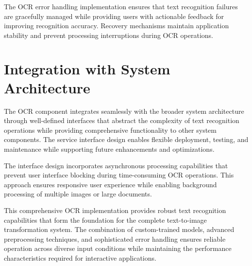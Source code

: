 The OCR error handling implementation ensures that text recognition failures are gracefully managed while providing users with actionable feedback for improving recognition accuracy. Recovery mechanisms maintain application stability and prevent processing interruptions during OCR operations.

\section{Integration with System Architecture}

The OCR component integrates seamlessly with the broader system architecture through well-defined interfaces that abstract the complexity of text recognition operations while providing comprehensive functionality to other system components. The service interface design enables flexible deployment, testing, and maintenance while supporting future enhancements and optimizations.

The interface design incorporates asynchronous processing capabilities that prevent user interface blocking during time-consuming OCR operations. This approach ensures responsive user experience while enabling background processing of multiple images or large documents.

This comprehensive OCR implementation provides robust text recognition capabilities that form the foundation for the complete text-to-image transformation system. The combination of custom-trained models, advanced preprocessing techniques, and sophisticated error handling ensures reliable operation across diverse input conditions while maintaining the performance characteristics required for interactive applications.